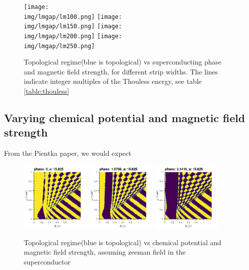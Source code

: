 \documentclass[10pt,a4paper]{article}
\newcommand{\img}{./images}
\begin{document}
	\begin{figure}[H]
		\texttt{[image: \\img/lmgap/lm100.png]}
		\texttt{[image: \\img/lmgap/lm150.png]}
		\texttt{[image: \\img/lmgap/lm200.png]}
		\texttt{[image: \\img/lmgap/lm250.png]}
		\caption{Topological regime(blue is topological) vs superconducting phase and magnetic field strength, for different strip widths. The lines indicate integer multiples of the Thouless energy, see table \ref{table:thouless}}
		\label{fig:lmZPcurr}
	\end{figure}
	\subsection{Varying chemical potential and magnetic field strength}
		From the Pientka paper, we would expect 
			\begin{figure}[H]
				\includegraphics[width=0.3\textwidth]{muB0.png}
				\includegraphics[width=0.3\textwidth]{muB5.png}
				\includegraphics[width=0.3\textwidth]{muB1.png}
				\caption{Topological regime(blue is topological) vs chemical potential and magnetic field strength, assuming zeeman field in the superconductor}
			\end{figure}
\end{document}
